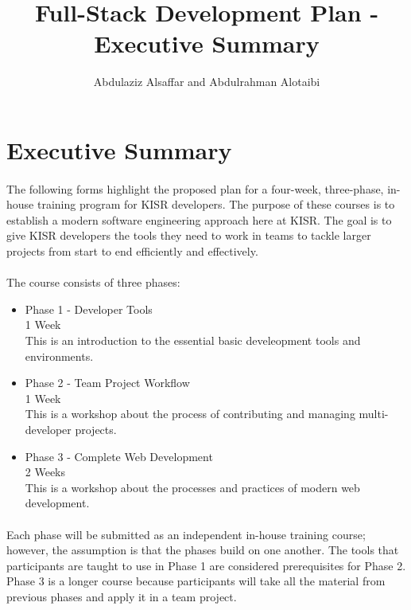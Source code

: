 \documentclass[a4paper,11pt]{article}
\author{Abdulaziz Alsa{f}far and Abdulrahman Alotaibi}
\title{Full-Stack Development Plan - Executive Summary}
\begin{document}
\maketitle
\pagestyle{plain}
\setcounter{page}{1}

\section{Executive Summary}

\paragraph{}
The following forms highlight the proposed plan for a four-week, three-phase, in-house training program for KISR developers. The purpose of these courses is to establish a modern software engineering approach here at KISR. The goal is to give KISR developers the tools they need to work in teams to tackle larger projects from start to end efficiently and effectively.

\paragraph{}
The course consists of three phases:
\begin{itemize}
	\item Phase 1 - Developer Tools\\1 Week\\This is an introduction to the essential basic develeopment tools and environments.
	\item Phase 2 - Team Project Workflow\\1 Week\\This is a workshop about the process of contributing and managing multi-developer projects.
	\item Phase 3 - Complete Web Development\\2 Weeks\\This is a workshop about the processes and practices of modern web development.
\end{itemize}

\paragraph{}
Each phase will be submitted as an independent in-house training course; however, the assumption is that the phases build on one another. The tools that participants are taught to use in Phase 1 are considered prerequisites for Phase 2. Phase 3 is a longer course because participants will take all the material from previous phases and apply it in a team project.
\end{document}
